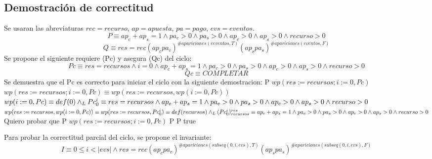 \documentclass[10pt,a4paper]{article}
\begin{document}
\subsection{Demostración de correctitud}

Se usaran las abreviaturas $rec = recurso$, $ap = apuesta$, $pa = pago$, $evs = eventos$.\\
\begin{equation}
    P \equiv ap_c + ap_s = 1 \land pa_c > 0 \land pa_s > 0 \land ap_c > 0 \land ap_s > 0 \land recurso > 0
\end{equation}
\begin{equation}
    Q \equiv  res = rec (ap_c pa_c)^{\# apariciones(eeventos, T)}(ap_s pa_s)^{\#apariciones(eventos, F)}
\end{equation}
Se propone el siguiente requiere (Pc) y asegura (Qc) del ciclo:
\begin{equation}
    Pc \equiv res=recursos \land i=0 \land ap_c + ap_s = 1 \land pa_c > 0 \land pa_s > 0 \land ap_c > 0 \land ap_s > 0 \land recurso > 0
\end{equation}
\begin{equation}
    Qc \equiv COMPLETAR
\end{equation}
Se demuestra que el Pc es correcto para iniciar el ciclo con la siguiente demostracion: \newline P \implica $wp(res:=recursos;i:=0,Pc)$ \newline $wp(res:=recursos;i:=0,Pc) \equiv wp(res:=recursos,wp(i:=0,Pc))$ \newline $wp(i:=0,Pc) \equiv def(0) \land _L Pc_{0}^i \equiv res=recursos \land ap_c + ap_s = 1 \land pa_c > 0 \land pa_s > 0 \land ap_c > 0 \land ap_s > 0 \land recurso > 0$ \newline $wp(res:=recursos,wp(i:=0,Pc)) \equiv wp(res:=recursos,Pc_{0}^i) \equiv def(recursos) \land _L (Pc_{0}^i)_{recursos}^{res} \equiv ap_c + ap_s = 1 \land pa_c > 0 \land pa_s > 0 \land ap_c > 0 \land ap_s > 0 \land recurso > 0$ \newline
Quiero probar que \newline P \implica $wp(res:=recursos;i:=0,Pc)$ \newline \equiv P \implica P \equiv true \newline

Para probar la correctitud parcial del ciclo, se propone el invariante:
\begin{equation}
	I \equiv 0 \leq i < |evs| \wedge res = rec (ap_c pa_c)^{\# apariciones(subseq(0, i, evs), T)}(ap_s pa_s)^{\#apariciones(subseq(0, i, evs), F)}
\end{equation}	
\end{document}
